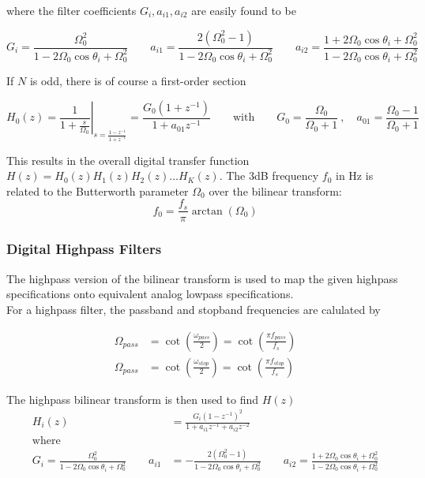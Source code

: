 where the filter coefficients $G_i, a_{i1}, a_{i2}$ are easily found to be

\begin{equation*}
	G_i = \frac{\Omega_0^2}{1 - 2 \Omega_0 \cos\theta_i + \Omega_0^2} \qquad
	a_{i1} = \frac{2(\Omega_0^2 - 1)}{1 - 2 \Omega_0 \cos\theta_i + \Omega_0^2} \qquad
	a_{i2} = \frac{1 + 2 \Omega_0 \cos\theta_i + \Omega_0^2}{1 - 2 \Omega_0 \cos\theta_i + \Omega_0^2}
\end{equation*}

If $N$ is odd, there is of course a first-order section

\begin{equation*}
	H_0(z) = \left.\frac{1}{1+\frac{s}{\Omega_0}}\right|_{s = \frac{1-z^{-1}}{1+z^{-1}}}
	= \frac{G_0 (1+z^{-1})}{1 + a_{01} z^{-1}}
	\qquad \text{with} \qquad
	G_0 = \frac{\Omega_0}{\Omega_0 + 1} \:,\quad 
	a_{01}=\frac{\Omega_0 - 1}{\Omega_0 + 1}
\end{equation*}

This results in the overall digital transfer function 
$H(z) = H_0(z) H_1(z) H_2(z) \ldots H_K(z)$. The 3dB frequency
$f_0$ in Hz is related to the Butterworth parameter $\Omega_0$ over the
bilinear transform:
\begin{equation*}
	f_0 = \frac{f_s}{\pi} \arctan(\Omega_0)
\end{equation*}

\subsubsection{Digital Highpass Filters}
The highpass version of the bilinear transform is used to map the given
highpass specifications onto equivalent analog lowpass specifications. \\

For a highpass filter, the passband and stopband frequencies are calulated
by

\begin{align*}
	\Omega_{pass} &= \cot \left( \frac{\omega_{pass}}{2} \right)
	= \cot\left( \frac{\pi f_{pass}}{f_s} \right) \\
	\Omega_{pass} &= \cot\left(\frac{\omega_{stop}}{2}\right)
	= \cot\left(\frac{\pi f_{stop}}{f_s}\right)
\end{align*}

The highpass bilinear transform is then used to find $H(z)$
\begin{align*}
	H_i(z) &= \frac{G_i (1-z^{-1})^2}{1 + a_{i1} z^{-1}+a_{i2}z^{-2}} \\
	\text{where} \\
	G_i = \frac{\Omega_0^2}{1-2\Omega_0\cos\theta_i + \Omega_0^2} \qquad
	a_{i1} &= -\frac{2(\Omega_0^2-1)}{1-2\Omega_0\cos\theta_i + \Omega_0^2} \qquad
	a_{i2} = \frac{1 + 2\Omega_0\cos\theta_i + \Omega_0^2}{1-2\Omega_0\cos\theta_i + \Omega_0^2}
\end{align*}

